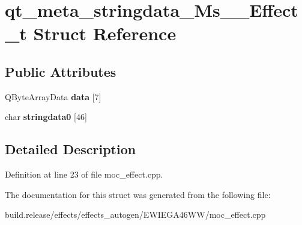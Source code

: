 \hypertarget{structqt__meta__stringdata___ms_____effect__t}{}\section{qt\+\_\+meta\+\_\+stringdata\+\_\+\+Ms\+\_\+\+\_\+\+Effect\+\_\+t Struct Reference}
\label{structqt__meta__stringdata___ms_____effect__t}
\subsection*{Public Attributes}
\begin{DoxyCompactItemize}
\item 
\mbox{\label{structqt__meta__stringdata___ms_____effect__t_ad1d87ee1a23b1ed5d62c990361411de7}} 
Q\+Byte\+Array\+Data {\bfseries data} \mbox{[}7\mbox{]}
\item 
\mbox{\label{structqt__meta__stringdata___ms_____effect__t_af8c5d1fe855f40f27074553609b35050}} 
char {\bfseries stringdata0} \mbox{[}46\mbox{]}
\end{DoxyCompactItemize}


\subsection{Detailed Description}


Definition at line 23 of file moc\+\_\+effect.\+cpp.



The documentation for this struct was generated from the following file\+:\begin{DoxyCompactItemize}
\item 
build.\+release/effects/effects\+\_\+autogen/\+E\+W\+I\+E\+G\+A46\+W\+W/moc\+\_\+effect.\+cpp\end{DoxyCompactItemize}
